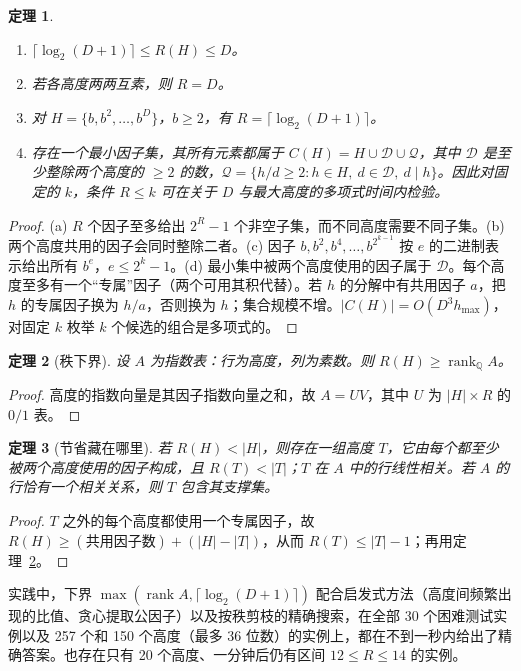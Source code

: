 \documentclass[11pt,a4paper]{article}
\theoremstyle{plain}
\newtheorem{theorem}{定理}
\theoremstyle{definition}
\theoremstyle{remark}
\begin{document}
\begin{theorem}\label{thm:R}
\begin{enumerate}[label=\upshape(\alph*)]
\item $\lceil\log_2(D+1)\rceil\le R(H)\le D$。
\item 若各高度两两互素，则 $R=D$。
\item 对 $H=\{b,b^2,\dots,b^D\}$，$b\ge2$，有 $R=\lceil\log_2(D+1)\rceil$。
\item 存在一个最小因子集，其所有元素都属于 $C(H)=H\cup\mathcal D\cup\mathcal Q$，其中 $\mathcal D$ 是至少整除两个高度的 $\ge2$ 的数，$\mathcal Q=\{h/d\ge2: h\in H,\ d\in\mathcal D,\ d\mid h\}$。因此对固定的 $k$，条件 $R\le k$ 可在关于 $D$ 与最大高度的多项式时间内检验。
\end{enumerate}
\end{theorem}
\begin{proof}
(a) $R$ 个因子至多给出 $2^R-1$ 个非空子集，而不同高度需要不同子集。(b) 两个高度共用的因子会同时整除二者。(c) 因子 $b,b^2,b^4,\dots,b^{2^{k-1}}$ 按 $e$ 的二进制表示给出所有 $b^e$，$e\le 2^k-1$。(d) 最小集中被两个高度使用的因子属于 $\mathcal D$。每个高度至多有一个“专属”因子（两个可用其积代替）。若 $h$ 的分解中有共用因子 $a$，把 $h$ 的专属因子换为 $h/a$，否则换为 $h$；集合规模不增。$|C(H)|=O(D^3h_{\max})$，对固定 $k$ 枚举 $k$ 个候选的组合是多项式的。
\end{proof}

\begin{theorem}[秩下界]\label{thm:rank}
设 $A$ 为指数表：行为高度，列为素数。则 $R(H)\ge\operatorname{rank}_{\mathbb Q}A$。
\end{theorem}
\begin{proof}
高度的指数向量是其因子指数向量之和，故 $A=UV$，其中 $U$ 为 $|H|\times R$ 的 $0/1$ 表。
\end{proof}

\begin{theorem}[节省藏在哪里]\label{thm:tree}
若 $R(H)<|H|$，则存在一组高度 $T$，它由每个都至少被两个高度使用的因子构成，且 $R(T)<|T|$；$T$ 在 $A$ 中的行线性相关。若 $A$ 的行恰有一个相关关系，则 $T$ 包含其支撑集。
\end{theorem}
\begin{proof}
$T$ 之外的每个高度都使用一个专属因子，故 $R(H)\ge(\text{共用因子数})+(|H|-|T|)$，从而 $R(T)\le|T|-1$；再用定理~\ref{thm:rank}。
\end{proof}

实践中，下界 $\max(\operatorname{rank}A,\lceil\log_2(D+1)\rceil)$ 配合启发式方法（高度间频繁出现的比值、贪心提取公因子）以及按秩剪枝的精确搜索，在全部 30 个困难测试实例以及 257 个和 150 个高度（最多 36 位数）的实例上，都在不到一秒内给出了精确答案。也存在只有 20 个高度、一分钟后仍有区间 $12\le R\le 14$ 的实例。
\end{document}
